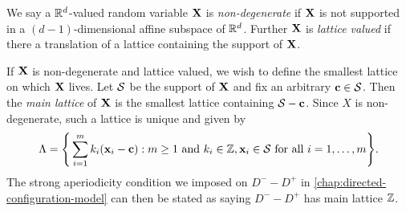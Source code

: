 We say a ${\mathbb R}^d$-valued random variable ${\mathbf X}$ is \emph{non-degenerate} if ${\mathbf X}$ is not supported in a $(d-1)$-dimensional affine subspace of ${\mathbb R}^d$. Further ${\mathbf X}$ is \emph{lattice valued} if there a translation of a lattice containing the support of ${\mathbf X}$.

If ${\mathbf X}$ is non-degenerate and lattice valued, we wish to define the smallest lattice on which ${\mathbf X}$ lives. Let ${\mathcal S}$ be the support of ${\mathbf X}$ and fix an arbitrary ${\mathbf c} \in {\mathcal S}$. Then the \emph{main lattice} of ${\mathbf X}$ is the smallest lattice containing ${\mathcal S} - {\mathbf c}$. Since $X$ is non-degenerate, such a lattice is unique and given by 
\begin{equation*}
    \Lambda = \Bigg\{
        \sum_{i=1}^m k_i ({\mathbf x}_i - {\mathbf c}) :
        \text{$m \geq 1$ and $k_i \in {\mathbb Z}, {\mathbf x}_i \in {\mathcal S}$ for all $i = 1, \ldots, m$}
    \Bigg\}.
\end{equation*}
The strong aperiodicity condition we imposed on $D^- - D^+$ in \cref{chap:directed-configuration-model} can then be stated as saying $D^- - D^+$ has main lattice ${\mathbb Z}$.


